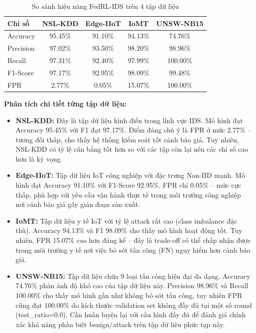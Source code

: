 \documentclass[12pt,a4paper]{article}
\begin{document}
\begin{table}[h]
\centering
\caption{So sánh hiệu năng FedRL-IDS trên 4 tập dữ liệu}
\begin{tabular}{|l|c|c|c|c|}
\hline
\textbf{Chỉ số} & \textbf{NSL-KDD} & \textbf{Edge-IIoT} & \textbf{IoMT} & \textbf{UNSW-NB15} \\ \hline
Accuracy & 95.45\% & 91.10\% & 94.13\% & 74.76\% \\ \hline
Precision & 97.02\% & 93.50\% & 98.20\% & 98.96\% \\ \hline
Recall & 97.31\% & 92.40\% & 97.99\% & 100.00\% \\ \hline
F1-Score & 97.17\% & 92.95\% & 98.09\% & 99.48\% \\ \hline
FPR & 2.77\% & 0.05\% & 15.07\% & 100.00\% \\ \hline
\end{tabular}
\end{table}
\vspace{-0.5em}

\textbf{Phân tích chi tiết từng tập dữ liệu:}

\begin{itemize}
    \item \textbf{NSL-KDD:} Đây là tập dữ liệu kinh điển trong lĩnh vực IDS. Mô hình đạt Accuracy 95.45\% với F1 đạt 97.17\%. Điểm đáng chú ý là FPR ở mức 2.77\% -- tương đối thấp, cho thấy hệ thống kiểm soát tốt cảnh báo giả. Tuy nhiên, NSL-KDD có tỷ lệ cân bằng tốt hơn so với các tập còn lại nên các chỉ số cao hơn là kỳ vọng.
    \item \textbf{Edge-IIoT:} Tập dữ liệu IoT công nghiệp với đặc trưng Non-IID mạnh. Mô hình đạt Accuracy 91.10\% với F1-Score 92.95\%. FPR chỉ 0.05\% -- mức cực thấp, phù hợp với yêu cầu vận hành thực tế trong môi trường công nghiệp nơi cảnh báo giả gây gián đoạn sản xuất.
    \item \textbf{IoMT:} Tập dữ liệu y tế IoT với tỷ lệ attack rất cao (class imbalance đặc thù). Accuracy 94.13\% và F1 98.09\% cho thấy mô hình hoạt động tốt. Tuy nhiên, FPR 15.07\% cao hơn đáng kể -- đây là trade-off có thể chấp nhận được trong môi trường y tế nơi việc bỏ sót tấn công (FN) nguy hiểm hơn cảnh báo giả.
    \item \textbf{UNSW-NB15:} Tập dữ liệu chứa 9 loại tấn công hiện đại đa dạng. Accuracy 74.76\% phản ánh độ khó cao của tập dữ liệu này. Precision 98.96\% và Recall 100.00\% cho thấy mô hình gần như không bỏ sót tấn công, tuy nhiên FPR cũng đạt 100.00\% do kích thước validation set không đầy đủ tại một số round (test\_ratio=0.0). Cần huấn luyện lại với cấu hình đầy đủ để đánh giá chính xác khả năng phân biệt benign/attack trên tập dữ liệu phức tạp này.
\end{itemize}
\end{document}
